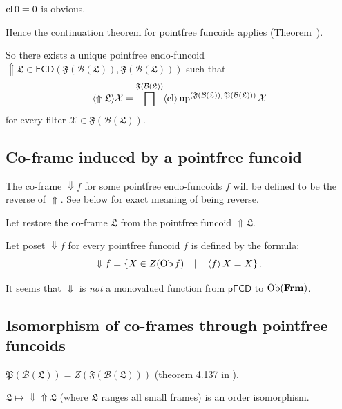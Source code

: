$\operatorname{cl} 0 = 0$ is obvious.

Hence the continuation theorem for pointfree funcoids applies (Theorem~).

So there exists a unique pointfree endo-funcoid $\Uparrow \mathfrak{L} \in
\mathsf{FCD} (\mathfrak{F} (\mathcal{B} (\mathfrak{L})) , \mathfrak{F}
(\mathcal{B} (\mathfrak{L})))$ such that
\[ \langle \Uparrow \mathfrak{L} \rangle \mathcal{X} = \bigsqcap^{\mathfrak{F}
   (\mathcal{B} (\mathfrak{L}))} \langle \operatorname{cl} \rangle
   \operatorname{up}^{\text{$(\mathfrak{F} (\mathcal{B} (\mathfrak{L})) , \mathfrak{P}
   (\mathcal{B} (\mathfrak{L})))$}}  \mathcal{X} \]
for every filter $\mathcal{X} \in \mathfrak{F} (\mathcal{B} (\mathfrak{L}))$.

\subsection{Co-frame induced by a pointfree funcoid}

The co-frame $\Downarrow f$ for some pointfree endo-funcoids $f$ will be
defined to be the reverse of $\Uparrow$. See below for exact meaning of being
reverse.

Let restore the co-frame $\mathfrak{L}$ from the pointfree funcoid $\Uparrow
\mathfrak{L}$.

Let poset $\Downarrow f$ for every pointfree funcoid $f$ is defined by the
formula:
\[ \Downarrow f = \left\{ X \in Z (\operatorname{Ob} f) \hspace{1em} | \hspace{1em}
   \left\langle f\right\rangle X = X \right\} . \]
\begin{rem}
  It seems that $\Downarrow$ is \emph{not} a monovalued function from
  $\mathsf{pFCD}$ to $\operatorname{Ob} (\mathbf{Frm})$.
\end{rem}

\subsection{Isomorphism of co-frames through pointfree funcoids}

\begin{rem}
  $\mathfrak{P} (\mathcal{B} (\mathfrak{L})) = Z (\mathfrak{F} (\mathcal{B}
  (\mathfrak{L})))$ (theorem 4.137 in {\cite{volume-1}}).
\end{rem}

\begin{thm}
  $\mathfrak{L} \mapsto \Downarrow \Uparrow \mathfrak{L}$ (where
  $\mathfrak{L}$ ranges all small frames) is an order isomorphism.
\end{thm}

